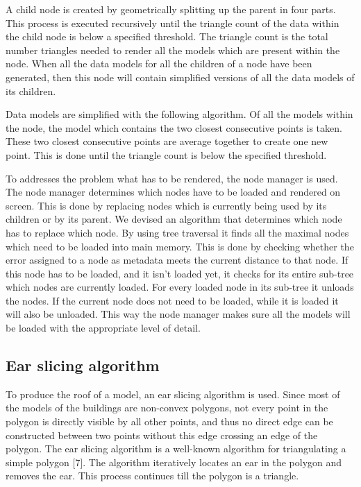 A child node is created by geometrically splitting up the parent in four parts. This process is executed recursively until the triangle count of the data within the child node is below a specified threshold. The triangle count is the total number triangles needed to render all the models which are present within the node. When all the data models for all the children of a node have been generated, then this node will contain simplified versions of all the data models of its children.

Data models are simplified with the following algorithm. Of all the models within the node, the model which contains the two closest consecutive points is taken. These two closest consecutive points are average together to create one new point. This is done until the triangle count is below the specified threshold.

To addresses the problem what has to be rendered, the node manager is used. The node manager determines which nodes have to be loaded and rendered on screen. This is done by replacing nodes which is currently being used by its children or by its parent. We devised an algorithm that determines which node has to replace which node. By using tree traversal it finds all the maximal nodes which need to be loaded into main memory. This is done by checking whether the error assigned to a node as metadata meets the current distance to that node. If this node has to be loaded, and it isn’t loaded yet, it checks for its entire sub-tree which nodes are currently loaded. For every loaded node in its sub-tree it unloads the nodes. If the current node does not need to be loaded, while it is loaded it will also be unloaded. This way the node manager makes sure all the models will be loaded with the appropriate level of detail.

\subsection{Ear slicing algorithm}
\label{subsec:EarSlicingAlgorithm}
To produce the roof of a model, an ear slicing algorithm is used. Since most of the models of the buildings are non-convex polygons, not every point in the polygon is directly visible by all other points, and thus no direct edge can be constructed between two points without this edge crossing an edge of the polygon. The ear slicing algorithm is a well-known algorithm for triangulating a simple polygon [7]. The algorithm iteratively locates an ear in the polygon and removes the ear. This process continues till the polygon is a triangle.

